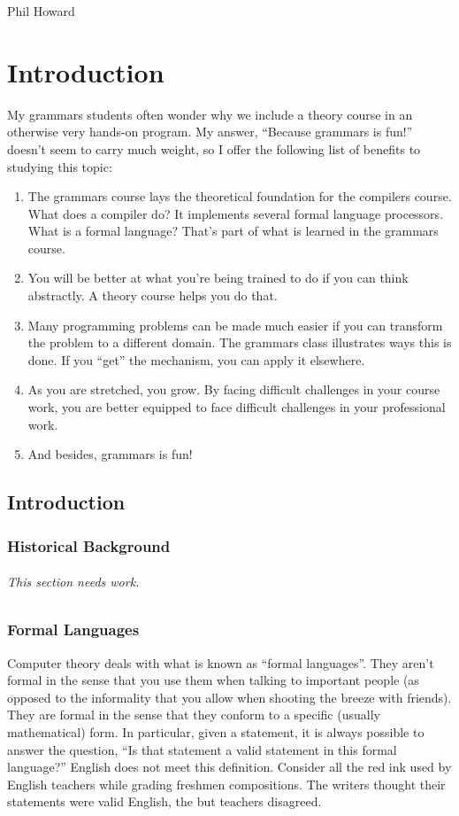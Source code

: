 \documentclass[letterpaper,12pt,openany,reqno]{book}%
\newcommand{\needswork}{\paragraph{This section needs work.}}
\begin{document}
Phil Howard
\mainmatter
\setlength{\parindent}{0cm} %
\setlength{\parskip}{8pt plus 2pt minus 2pt}

\part{Introduction}
My grammars students often wonder why we include a theory course in an otherwise very hands-on program. My answer, ``Because grammars is fun!'' doesn't seem to carry much weight, so I offer the following list of benefits to studying this topic:

\begin{enumerate}
\item The grammars course lays the theoretical foundation for the compilers course. What does a compiler do? It implements several formal language processors. What is a formal language? That's part of what is learned in the grammars course.
\item You will be better at what you're being trained to do if you can think abstractly. A theory course helps you do that.
\item Many programming problems can be made much easier if you can transform the problem to a different domain. The grammars class illustrates ways this is done. If you ``get'' the mechanism, you can apply it elsewhere.
\item As you are stretched, you grow. By facing difficult challenges in your course work, you are better equipped to face difficult challenges in your professional work.
\item And besides, grammars is fun!
\end{enumerate}

\chapter{Introduction}
\section{Historical Background}
\needswork
\section{Formal Languages}
Computer theory deals with what is known as ``formal languages''. They aren't formal in the sense that you use them when talking to important people (as opposed to the informality that you allow when shooting the breeze with friends). They are formal in the sense that they conform to a specific (usually mathematical) form. In particular, given a statement, it is always possible to answer the question, ``Is that statement a valid statement in this formal language?'' English does not meet this definition. Consider all the red ink used by English teachers while grading freshmen compositions. The writers thought their statements were valid English, the but teachers disagreed.
\end{document}
